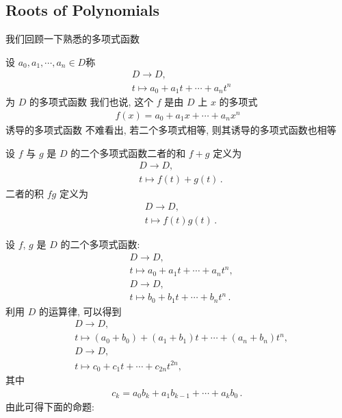 \subsection*{Roots of Polynomials}

我们回顾一下熟悉的多项式函数\period

\begin{definition}
    设 $a_0, a_1, \cdots, a_n \in D$\period 称
    \begin{align*}
         & D \to D, \tag*{$f \colon$}               \\
         & t \mapsto a_0 + a_1 t + \cdots + a_n t^n
    \end{align*}
    为 $D$ 的多项式函数 \period 我们也说, 这个 $f$ 是由 $D$ 上 $x$ 的多项式
    \begin{align*}
        f(x) = a_0 + a_1 x + \cdots + a_n x^n
    \end{align*}
    诱导的多项式函数 \period 不难看出, 若二个多项式相等, 则其诱导的多项式函数也相等\period
\end{definition}

\begin{definition}
    设 $f$ 与 $g$ 是 $D$ 的二个多项式函数\period 二者的和 $f+g$ 定义为
    \begin{align*}
         & D \to D, \tag*{$f+g \colon$}  \\
         & t \mapsto f(t) + g(t) \period
    \end{align*}
    二者的积 $fg$ 定义为
    \begin{align*}
         & D \to D, \tag*{$fg \colon$} \\
         & t \mapsto f(t) g(t) \period
    \end{align*}
\end{definition}

设 $f$, $g$ 是 $D$ 的二个多项式函数:
\begin{align*}
     & D \to D, \tag*{$f \colon$}                       \\
     & t \mapsto a_0 + a_1 t + \cdots + a_n t^n,        \\
     & D \to D, \tag*{$g \colon$}                       \\
     & t \mapsto b_0 + b_1 t + \cdots + b_n t^n \period
\end{align*}
利用 $D$ 的运算律, 可以得到
\begin{align*}
     & D \to D, \tag*{$f+g \colon$}                                      \\
     & t \mapsto (a_0 + b_0) + (a_1 + b_1) t + \cdots + (a_n + b_n) t^n, \\
     & D \to D, \tag*{$fg \colon$}                                       \\
     & t \mapsto c_0 + c_1 t + \cdots + c_{2n} t^{2n},
\end{align*}
其中
\begin{align*}
    c_k = a_0 b_k + a_1 b_{k-1} + \cdots + a_k b_0 \period
\end{align*}
由此可得下面的命题:

